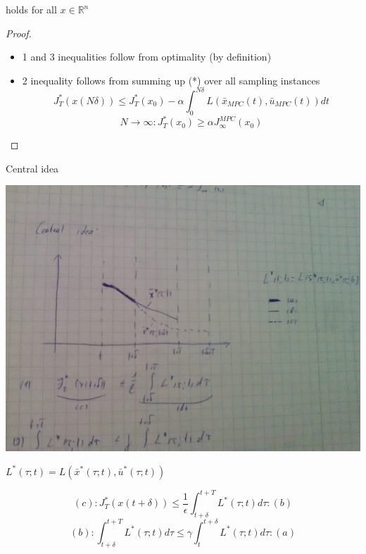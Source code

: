 holds for all $x \in \mathbb{R}^n$

\begin{proof}
\begin{itemize}
\item 1 and 3 inequalities follow from optimality (by definition)
\item 2 inequality follows from summing up (*) over all sampling instances
\begin{equation}
J^*_T(x(N\delta)) \leq J_T^*(x_0) - \alpha \int_0^{N\delta}L(\bar x_{MPC}(t), \bar u_{MPC}(t))dt
\end{equation}
\begin{equation}
N \to \infty : J_T^*(x_0) \geq \alpha J_{\infty}^{MPC}(x_0) 
\end{equation}
\end{itemize}
\end{proof}

Central idea
\begin{center}
\includegraphics[scale=0.1]{1}
\end{center}

$L^*(\tau;t) = L(\bar x^*(\tau;t), \bar u^*(\tau;t))$

\begin{equation}\label{c_b_inequality}
(c): J_T^*(x(t+\delta)) \leq \frac{1}{\epsilon} \int_{t+\delta}^{t+T}L^*(\tau;t)d\tau :(b)
\end{equation}
\begin{equation}\label{b_a_inequality}
(b): \int_{t+\delta}^{t+T}L^*(\tau;t)d\tau \leq \gamma \int_{t}^{t+\delta}L^*(\tau;t)d\tau :(a)
\end{equation} 

